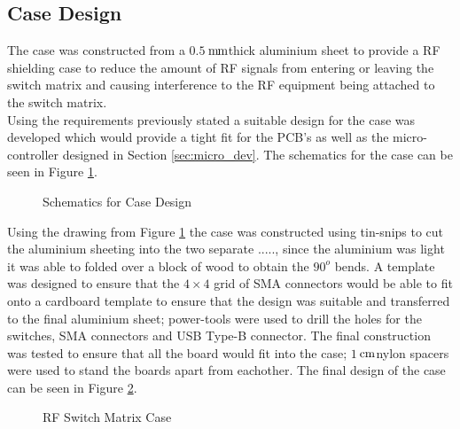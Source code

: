\documentclass[12pt,openany,a4paper]{book}
\newcommand{\pack}	{\hspace{-0.08em}}
\newcommand{\cm}	{\ensuremath{\rm\,cm}}
\newcommand{\mm}	{\ensuremath{\rm\,m\pack m}}
\begin{document}
\subsection{Case Design}
The case was constructed from a $0.5$\mm thick aluminium sheet to provide a RF shielding case to reduce the amount of RF signals from entering or leaving the switch matrix and causing interference to the RF equipment being attached to the switch matrix.
\\[0.2cm]
Using the requirements previously stated a suitable design for the case was developed which would provide a tight fit for the PCB's as well as the micro-controller designed in Section \ref{sec:micro_dev}. The schematics for the case can be seen in Figure \ref{fig:case-schem}.
\begin{figure}[H]
	\centering
	\caption{Schematics for Case Design}
	\label{fig:case-schem}
\end{figure} 
Using the drawing from Figure \ref{fig:case-schem} the case was constructed using tin-snips to cut the aluminium sheeting into the two separate ....., since the aluminium was light it was able to folded over a block of wood to obtain the $90^o$ bends. A template was designed to ensure that the $4\times 4$ grid of SMA connectors would be able to fit onto a cardboard template to ensure that the design was suitable and transferred to the final aluminium sheet;  power-tools were used to drill the holes for the switches, SMA connectors and USB Type-B connector. The final construction was tested to ensure that all the board would fit into the case; $1$\cm nylon spacers were used to stand the boards apart from eachother. The final design of the case can be seen in Figure \ref{fig:case}.
\begin{figure}[H]
	\centering
	\caption{RF Switch Matrix Case}
	\label{fig:case}
\end{figure} 




\end{document}
